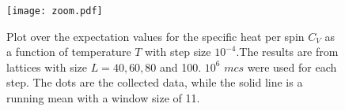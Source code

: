 \begin{figure}[htbp]
	\centering
	\texttt{[image: zoom.pdf]}
	\caption{Plot over the expectation values for the specific heat per spin $C_V$ as a function of temperature $T$ with step size $10^{-4}$.The results are from lattices with size $L=40,60,80$ and 100. $10^6$ $mcs$ were used for each step. The dots are the collected data, while the solid line is a running mean with a window size of 11.}
	\label{fig:zoom}
\end{figure}

